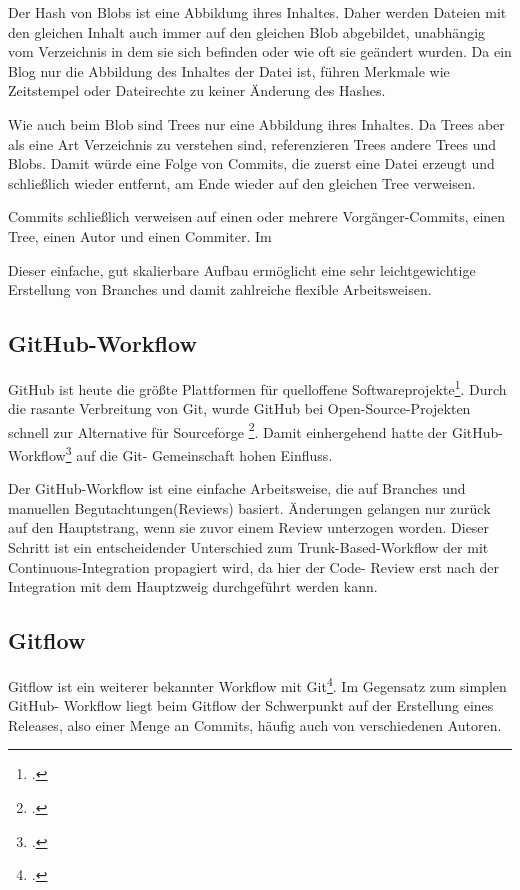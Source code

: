 Der Hash von Blobs ist eine Abbildung ihres Inhaltes. Daher werden Dateien mit den gleichen Inhalt auch immer auf den 
gleichen Blob abgebildet, unabhängig vom Verzeichnis in dem sie sich befinden oder wie oft sie geändert wurden. Da ein 
Blog nur die Abbildung des Inhaltes der Datei ist, führen Merkmale wie Zeitstempel oder Dateirechte zu keiner Änderung 
des Hashes.

Wie auch beim Blob sind Trees nur eine Abbildung ihres Inhaltes. Da Trees aber als eine Art Verzeichnis zu verstehen 
sind, referenzieren Trees andere Trees und Blobs. Damit würde eine Folge von Commits, die zuerst eine Datei erzeugt und 
schließlich wieder entfernt, am Ende wieder auf den gleichen Tree verweisen.

Commits schließlich verweisen auf einen oder mehrere Vorgänger-Commits, einen Tree, einen Autor und einen Commiter. Im 

Dieser einfache, gut skalierbare Aufbau ermöglicht eine sehr leichtgewichtige Erstellung von Branches und damit 
zahlreiche flexible Arbeitsweisen.

\subsection{GitHub-Workflow}

GitHub ist heute die größte Plattformen für quelloffene Softwareprojekte\footcite{github-marketshare-datanyze}. Durch die 
rasante Verbreitung von Git, wurde GitHub bei Open-Source-Projekten schnell zur Alternative für Sourceforge
\footcite{heise-github-2011}. Damit einhergehend hatte der GitHub-Workflow\footcite{github-workflow-intro} auf die Git-
Gemeinschaft hohen Einfluss.

Der GitHub-Workflow ist eine einfache Arbeitsweise, die auf Branches und manuellen Begutachtungen(Reviews) basiert. 
Änderungen gelangen nur zurück auf den Hauptstrang, wenn sie zuvor einem Review unterzogen worden. Dieser Schritt ist ein 
entscheidender Unterschied zum Trunk-Based-Workflow der mit Continuous-Integration propagiert wird, da hier der Code-
Review erst nach der Integration mit dem Hauptzweig durchgeführt werden kann.

\subsection{Gitflow}

Gitflow ist ein weiterer bekannter Workflow mit Git\footcite{nvie-git-branch-model}. Im Gegensatz zum simplen GitHub-
Workflow liegt beim Gitflow der Schwerpunkt auf der Erstellung eines Releases, also einer Menge an Commits, häufig auch
von verschiedenen Autoren.

